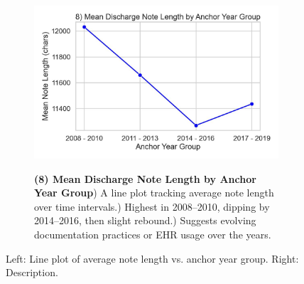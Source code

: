 \begin{figure}[ht!]
    \centering
    \begin{subfigure}{0.42\textwidth}
        \includegraphics[width=\linewidth]{mimic_plots/plot8.jpg}
    \end{subfigure}\hfill
    \begin{subfigure}{0.54\textwidth}
        \footnotesize
        \textbf{(8) Mean Discharge Note Length by Anchor Year Group}) A line plot tracking average note length over time intervals.) Highest in 2008--2010, dipping by 2014--2016, then slight rebound.) Suggests evolving documentation practices or EHR usage over the years.
    \end{subfigure}
    \caption{Left: Line plot of average note length vs. anchor year group. Right: Description.}
    \label{fig:plot8}
\end{figure}


